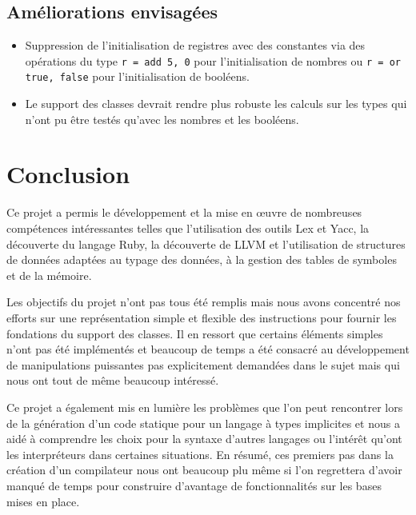 \documentclass[12pt]{article}
\begin{document}
\subsection{Améliorations envisagées}
\begin{itemize}
	\item Suppression de l'initialisation de registres avec des constantes via des opérations du type \verb!r = add 5, 0! pour l'initialisation de nombres ou \verb!r = or true, false! pour l'initialisation de booléens.
	\item Le support des classes devrait rendre plus robuste les calculs sur les types qui n'ont pu être testés qu'avec les nombres et les booléens.
\end{itemize}

\section{Conclusion}

Ce projet a permis le développement et la mise en œuvre de nombreuses compétences intéressantes telles que l'utilisation des outils Lex et Yacc, la découverte du langage Ruby, la découverte de LLVM et l'utilisation de structures de données adaptées au typage des données, à la gestion des tables de symboles et de la mémoire.

Les objectifs du projet n'ont pas tous été remplis mais nous avons concentré nos efforts sur une représentation simple et flexible des instructions pour fournir les fondations du support des classes. Il en ressort que certains éléments simples n'ont pas été implémentés et beaucoup de temps a été consacré au développement de manipulations puissantes pas explicitement demandées dans le sujet mais qui nous ont tout de même beaucoup intéressé.

Ce projet a également mis en lumière les problèmes que l'on peut rencontrer lors de la génération d'un code statique pour un langage à types implicites et nous a aidé à comprendre les choix pour la syntaxe d'autres langages ou l'intérêt qu'ont les interpréteurs dans certaines situations. En résumé, ces premiers pas dans la création d’un compilateur nous ont beaucoup plu même si l'on regrettera d'avoir manqué de temps pour construire d'avantage de fonctionnalités sur les bases mises en place.
\end{document}
